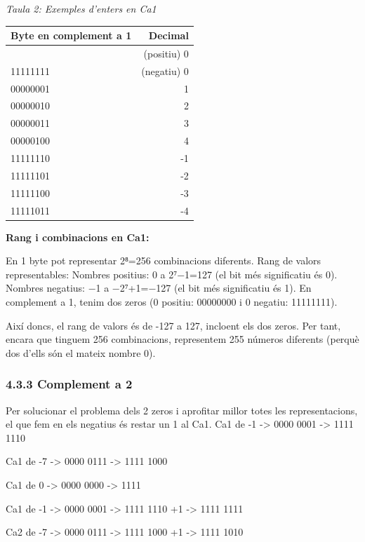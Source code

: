 \documentclass[
  12 pt,
  a4paper,
]{article}
\begin{document}
\emph{Taula 2: Exemples d'enters en Ca1}

\begin{longtable}[]{@{}lr@{}}
\toprule\noalign{}
Byte en complement a 1 & Decimal \\
\midrule\noalign{}
\endhead
\bottomrule\noalign{}
\endlastfoot
00000000 & (positiu) 0 \\
11111111 & (negatiu) 0 \\
00000001 & 1 \\
00000010 & 2 \\
00000011 & 3 \\
00000100 & 4 \\
11111110 & -1 \\
11111101 & -2 \\
11111100 & -3 \\
11111011 & -4 \\
\end{longtable}

\textbf{Rang i combinacions en Ca1:}

En 1 byte pot representar 2⁸=256 combinacions diferents. Rang de valors
representables: Nombres positius: 0 a 2⁷−1=127 (el bit més significatiu
és 0). Nombres negatius: −1 a −2⁷+1=−127 (el bit més significatiu és 1).
En complement a 1, tenim dos zeros (0 positiu: 00000000 i 0 negatiu:
11111111).

Així doncs, el rang de valors és de -127 a 127, incloent els dos zeros.
Per tant, encara que tinguem 256 combinacions, representem 255 números
diferents (perquè dos d'ells són el mateix nombre 0).

\subsubsection{4.3.3 Complement a 2}\label{complement-a-2}

Per solucionar el problema dels 2 zeros i aprofitar millor totes les
representacions, el que fem en els negatius és restar un 1 al Ca1. Ca1
de -1 -\textgreater{} 0000 0001 -\textgreater{} 1111 1110

Ca1 de -7 -\textgreater{} 0000 0111 -\textgreater{} 1111 1000

Ca1 de 0 -\textgreater{} 0000 0000 -\textgreater{} 1111

Ca1 de -1 -\textgreater{} 0000 0001 -\textgreater{} 1111 1110 +1
-\textgreater{} 1111 1111

Ca2 de -7 -\textgreater{} 0000 0111 -\textgreater{} 1111 1000 +1
-\textgreater{} 1111 1010
\end{document}
